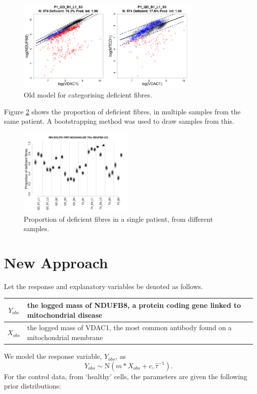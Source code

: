 \documentclass[a4paper, 12pt]{article}
\begin{document}
\begin{figure}[H]
    \centering
    \includegraphics[width=0.8\textwidth]{freq_reg.png}
    \caption{Old model for categorising deficient fibres.}
    \label{fig:PlotsWithDots}
\end{figure}
Figure \ref{fig:StripByProt} shows the proportion of deficient fibres, in multiple samples from the same patient. A bootstrapping method was used to draw samples from this. 
\begin{figure}[H]
    \centering
    \includegraphics[width=0.5\textwidth]{freq_prop.png}
    \caption{Proportion of deficient fibres in a single patient, from different samples.}
    \label{fig:StripByProt}
\end{figure}


\section*{New Approach}

Let the response and explanatory variables be denoted as follows. 
\begin{center}
\begin{tabular}{ c | l }
    $Y_{obs}$ & the logged mass of NDUFB8, a protein coding gene linked to mitochondrial disease  \\
    \hline
    $X_{obs}$ & the logged mass of VDAC1, the most common antibody found on a mitochondrial membrane \\
\end{tabular}
\end{center}
We model the response variable, $Y_{obs}$, as
\begin{equation}
    Y_{obs} \sim \text{N}\left( m*X_{obs}+c, \hat\tau^{-1} \right).
\end{equation}
For the control data, from `healthy' cells, the parameters are given the following prior distributions:
\end{document}
